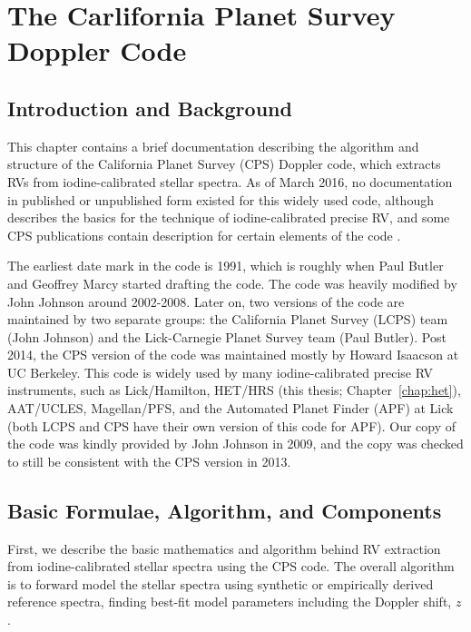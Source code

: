 \chapter{The Carlifornia Planet Survey Doppler Code}\label{chap:doppler}

\section{Introduction and Background}

This chapter contains a brief documentation describing the algorithm
and structure of the California Planet Survey (CPS) Doppler code,
which extracts RVs from iodine-calibrated stellar spectra. As of March
2016, no documentation in published or unpublished form existed for
this widely used code, although \cite{butler1996} describes the basics
for the technique of iodine-calibrated precise RV, and some CPS
publications contain description for certain elements of the code
\citep[e.g.,][]{2006ApJ...647..600J, 2009ApJ...696...75H, 2011ApJ...726...73H,
  2011ApJS..197...26J}.

The earliest date mark in the code is 1991, which is roughly when Paul
Butler and Geoffrey Marcy started drafting the code. The code was
heavily modified by John Johnson around 2002-2008. Later on, two
versions of the code are maintained by two separate groups: the
California Planet Survey (LCPS) team (John Johnson) and the
Lick-Carnegie Planet Survey team (Paul Butler). Post 2014, the CPS
version of the code was maintained mostly by Howard Isaacson at UC
Berkeley. This code is widely used by many iodine-calibrated
precise RV instruments, such as Lick/Hamilton, HET/HRS (this thesis;
Chapter~\ref{chap:het}), AAT/UCLES, Magellan/PFS, and the Automated
Planet Finder (APF) at Lick (both LCPS and CPS have their own version
of this code for APF). Our copy of the code was kindly provided by
John Johnson in 2009, and the copy was checked to still be consistent
with the CPS version in 2013.


\section{Basic Formulae, Algorithm, and Components}

First, we describe the basic mathematics and algorithm behind RV
extraction from iodine-calibrated stellar spectra using the CPS
code. The overall algorithm is to forward model the stellar spectra
using synthetic or empirically derived reference spectra, finding
best-fit model parameters including the Doppler shift, $z$.

